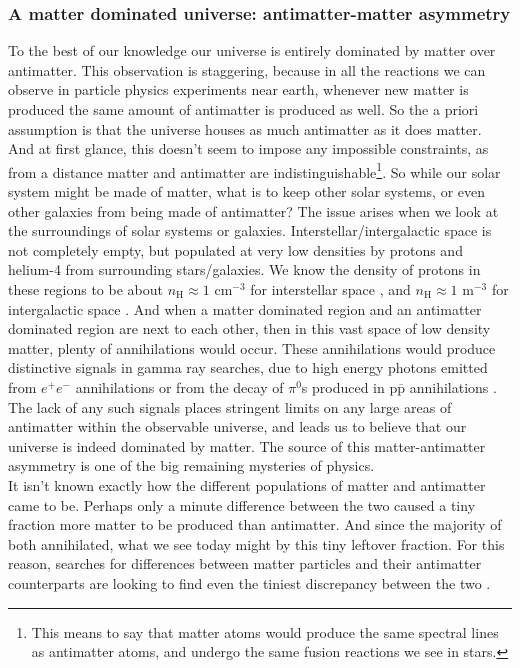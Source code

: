 \subsubsection{A matter dominated universe: antimatter-matter asymmetry}
To the best of our knowledge our universe is  entirely dominated by matter over antimatter. This observation is staggering, because in all the reactions we can observe in particle physics experiments near earth, whenever new matter is produced the same amount of antimatter is produced as well. So the a priori assumption is that the universe houses as much antimatter as it does matter. And at first glance, this doesn't seem to impose any impossible constraints, as from a distance matter and antimatter are indistinguishable\footnote{This means to say that matter atoms would produce the same spectral lines as antimatter atoms, and undergo the same fusion reactions we see in stars.}. So while our solar system might be made of matter, what is to keep other solar systems, or even other galaxies from being made of antimatter? The issue arises when we look at the surroundings of solar systems or galaxies. Interstellar/intergalactic space is not completely empty, but populated at very low densities by protons and helium-4 from surrounding stars/galaxies. We know the density of protons in these regions to be about $n_\mathrm{H} \approx 1$ cm$^{-3}$ for interstellar space \cite{Ferri_re_2001}, and $n_\mathrm{H} \approx 1$ m$^{-3}$ for intergalactic space \cite{IGM_density}. And when a matter dominated region and an antimatter dominated region are next to each other, then in this vast space of low density matter, plenty of annihilations would occur. These annihilations would produce distinctive signals in gamma ray searches, due to high energy photons emitted from $e^+e^-$ annihilations or from the decay of $\pi^0$s produced in $\mathrm{p}\overline{\mathrm{p}}$ annihilations \cite{Schönfelder1989}. The lack of any such signals places stringent limits on any large areas of antimatter within the observable universe, and leads us to believe that our universe is indeed dominated by matter. The source of this matter-antimatter asymmetry is one of the big remaining mysteries of physics.  \\

It isn't known exactly how the different populations of matter and antimatter came to be. Perhaps only a minute difference between the two caused a tiny fraction more matter to be produced than antimatter. And since the majority of both annihilated, what we see today might by this tiny leftover fraction. For this reason, searches for differences between matter particles and their antimatter counterparts are looking to find even the tiniest discrepancy between the two \cite{D0_CP_violations, Alpha_CERN}. 

